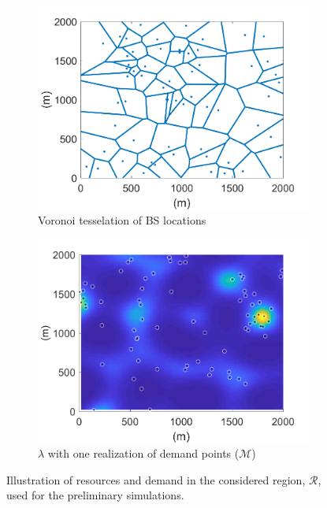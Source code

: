 \documentclass[12pt,dvipsnames]{report}
\begin{document}
\begin{figure}[htp]
	\centering
	\begin{subfigure}{.49\textwidth}
		\centering
		\includegraphics[width=1\linewidth]{Figures/Prelim_BSLocationsVoronoi}
		\caption{\small Voronoi tesselation of BS locations}
		\label{fig:Prelim_BSLocVor}
	\end{subfigure} \hfill
	\begin{subfigure}{.49\textwidth}
		\centering
		\includegraphics[width=1\linewidth]{Figures/Prelim_SSLTnsPPP_demandpointreal}
		\caption{\small $\lambda$ with one realization of demand points ($\mathcal{M}$)}
		\label{fig:Prelim_SSLTDPReal}
	\end{subfigure}
	\caption[Illustration of resources and demand used for the preliminary simulations]{Illustration of resources and demand in the considered region, $\mathcal{R}$, used for the preliminary simulations.}
	\label{fig:Prelim_NetworkArea}
\end{figure}
\end{document}
